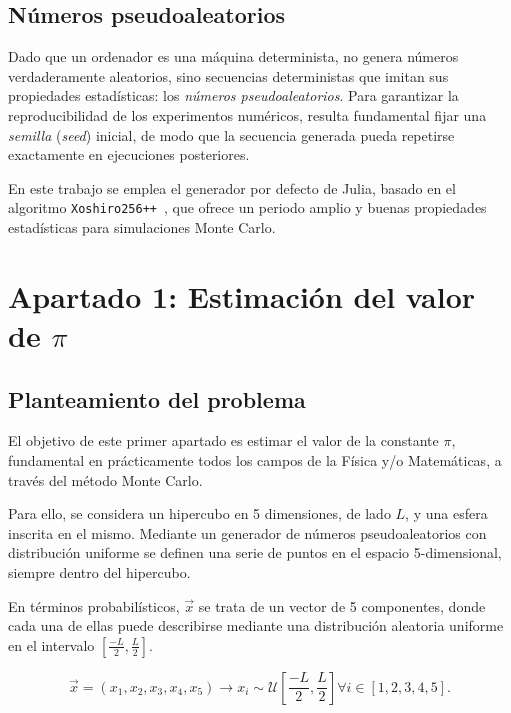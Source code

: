 \documentclass[11pt, a4paper]{article}
\begin{document}
\subsection{Números pseudoaleatorios}
Dado que un ordenador es una máquina determinista, no genera números verdaderamente aleatorios, sino secuencias deterministas que imitan sus propiedades estadísticas: los \textit{números pseudoaleatorios}. Para garantizar la reproducibilidad de los experimentos numéricos, resulta fundamental fijar una \textit{semilla} (\textit{seed}) inicial, de modo que la secuencia generada pueda repetirse exactamente en ejecuciones posteriores.

En este trabajo se emplea el generador por defecto de Julia, basado en el algoritmo \texttt{Xoshiro256++}~\cite{JuliaRandomDocs}, que ofrece un periodo amplio y buenas propiedades estadísticas para simulaciones Monte Carlo.

\section{Apartado 1: Estimación del valor de \texorpdfstring{$\pi$}{pi}}

\subsection{Planteamiento del problema}
El objetivo de este primer apartado es estimar el valor de la constante $\pi$, fundamental en prácticamente todos los campos de la Física y/o Matemáticas, a través del método Monte Carlo.

Para ello, se considera un hipercubo en 5 dimensiones, de lado $L$, y una esfera inscrita en el mismo. Mediante un generador de números pseudoaleatorios con distribución uniforme se definen una serie de puntos en el espacio 5-dimensional, siempre dentro del hipercubo.

En términos probabilísticos, $\vec{x}$ se trata de un vector de 5 componentes, donde cada una de ellas puede describirse mediante una distribución aleatoria uniforme en el intervalo $[\frac{-L}{2}, \frac{L}{2}]$.

\begin{equation}
    \vec{x} = (x_1, x_2, x_3, x_4, x_5) \rightarrow x_i \sim \mathcal{U}\left[\frac{-L}{2}, \frac{L}{2}\right] \forall i \in [1,2,3,4,5].
\end{equation}
\end{document}
